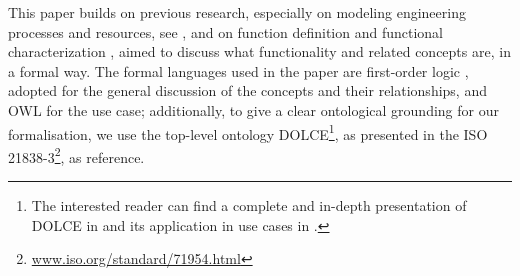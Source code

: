 \documentclass[sw]{iosart2x}
\newcommand{\DOLCE}{\textsc{DOLCE}\xspace} %
\newcommand{\OWL}{\textnormal{OWL}\xspace}
\begin{document}
This paper builds on previous research, especially on modeling engineering processes and resources, see \cite{borgoCapabilitiesCapacitiesFunctionalities2021,sanfilippoOntologicalModelingManufacturing2021,Sanfilippo-BBGT2018IFIP,Borgo-L2007}, and on function definition and functional characterization  \cite{mizoguchiUnifyingDefinitionArtifact2016,borgoFormalOntologicalPerspective2009,garbaczTwoOntologydrivenFormalisations2011,borgoKnowledgebasedAdaptiveAgents2019}, aimed to discuss what functionality and related concepts are, in a formal way. 
The formal languages used in the paper are first-order logic \cite{sep-logic-classical}, adopted for the general discussion of the concepts and their relationships, and \OWL \cite{OWL2-QUICK-REFERENCE} for the use case; additionally, to give a clear ontological grounding for our formalisation, we use the top-level ontology \DOLCE\footnote{The interested reader can find a complete and in-depth presentation of \DOLCE in \cite{masoloWonderWebDeliverableD182003} and its application in use cases in \cite{borgoDOLCEDescriptiveOntology2022}.}, as presented in the ISO 21838-3\footnote{\url{www.iso.org/standard/71954.html}}, as reference.
\end{document}
